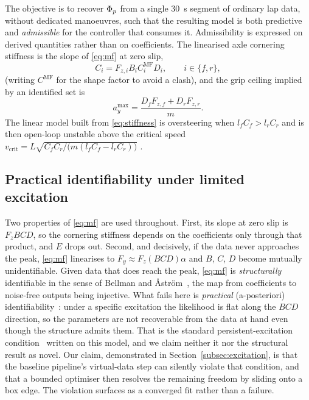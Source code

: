 The objective is to recover $\Phi_{p}$ from a single \SI{30}{\second} segment of
ordinary lap data, without dedicated manoeuvres, such that the resulting model
is both predictive and \emph{admissible} for the controller that consumes it.
Admissibility is expressed on derived quantities rather than on coefficients.
The linearised axle cornering stiffness is the slope of \eqref{eq:mf} at zero
slip,
\begin{equation}
C_{i}=F_{z,i}B_{i}C_{i}^{\mathrm{MF}}D_{i},\qquad i\in\{f,r\},
\label{eq:stiffness}
\end{equation}
(writing $C^{\mathrm{MF}}$ for the shape factor to avoid a clash), and the grip
ceiling implied by an identified set is
\begin{equation}
a_{y}^{\max}=\frac{D_{f}F_{z,f}+D_{r}F_{z,r}}{m}.
\label{eq:gripceiling}
\end{equation}
The linear model built from \eqref{eq:stiffness} is oversteering when
$l_{f}C_{f}>l_{r}C_{r}$ and is then open-loop unstable above the critical speed
$v_{\mathrm{crit}}=L\sqrt{C_{f}C_{r}/\big(m(l_{f}C_{f}-l_{r}C_{r})\big)}$
\cite{rajamani2012}.

\subsection{Practical identifiability under limited excitation}
\label{subsec:identifiability}

Two properties of \eqref{eq:mf} are used throughout. First, its slope at zero
slip is $F_{z}BCD$, so the cornering stiffness depends on the coefficients
only through that product, and $E$ drops out. Second, and decisively, if the
data never approaches the peak, \eqref{eq:mf} linearises to $F_{y}\approx
F_{z}(BCD)\alpha$ and $B$, $C$, $D$ become mutually unidentifiable. Given data
that does reach the peak, \eqref{eq:mf} is \emph{structurally} identifiable in
the sense of Bellman and {\AA}str{\"o}m~\cite{bellman1970structural}, the map
from coefficients to noise-free outputs being injective. What fails here is
\emph{practical} (a-posteriori)
identifiability~\cite{raue2009practical}: under a specific excitation the
likelihood is flat along the $BCD$ direction, so the parameters are not
recoverable from the data at hand even though the structure admits them. That
is the standard persistent-excitation
condition~\cite{ljung1999sysid,astrom1995adaptive} written on this model, and
we claim neither it nor the structural result as novel. Our claim, demonstrated
in Section~\ref{subsec:excitation}, is that the baseline pipeline's
virtual-data step can silently violate that condition, and that a bounded
optimiser then resolves the remaining freedom by sliding onto a box edge. The
violation surfaces as a converged fit rather than a failure.

